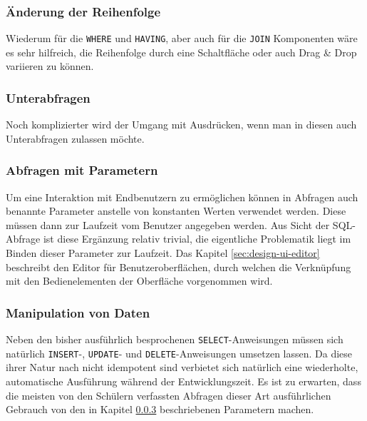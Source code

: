 \subsubsection{Änderung der Reihenfolge}

Wiederum für die \texttt{WHERE} und \texttt{HAVING}, aber auch für die \texttt{JOIN} Komponenten wäre es sehr hilfreich, die Reihenfolge durch eine Schaltfläche oder auch Drag \& Drop variieren zu können.

\subsubsection{Unterabfragen}

Noch komplizierter wird der Umgang mit Ausdrücken, wenn man in diesen auch Unterabfragen zulassen möchte.


\subsubsection{Abfragen mit Parametern}
\label{sec:design-query-params}

Um eine Interaktion mit Endbenutzern zu ermöglichen können in Abfragen auch benannte Parameter anstelle von konstanten Werten verwendet werden. Diese müssen dann zur Laufzeit vom Benutzer angegeben werden. Aus Sicht der SQL-Abfrage ist diese Ergänzung relativ trivial, die eigentliche Problematik liegt im Binden dieser Parameter zur Laufzeit. Das Kapitel \ref{sec:design-ui-editor} beschreibt den Editor für Benutzeroberflächen, durch welchen die Verknüpfung mit den Bedienelementen der Oberfläche vorgenommen wird.

\subsubsection{Manipulation von Daten}

Neben den bisher ausführlich besprochenen \texttt{SELECT}-Anweisungen müssen sich natürlich \texttt{INSERT}-, \texttt{UPDATE}- und \texttt{DELETE}-Anweisungen umsetzen lassen. Da diese ihrer Natur nach nicht idempotent sind verbietet sich natürlich eine wiederholte, automatische Ausführung während der Entwicklungszeit. Es ist zu erwarten, dass die meisten von den Schülern verfassten Abfragen dieser Art ausführlichen Gebrauch von den in Kapitel \ref{sec:design-query-params} beschriebenen Parametern machen.

